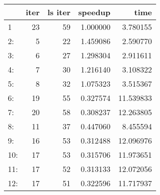 \begin{tabular}{lrrrr}
\toprule
{} &  iter &  ls iter &   speedup &       time \\
\midrule
1   &    23 &       59 &  1.000000 &   3.780155 \\
2:  &     5 &       22 &  1.459086 &   2.590770 \\
3:  &     6 &       27 &  1.298304 &   2.911611 \\
4:  &     7 &       30 &  1.216140 &   3.108322 \\
5:  &     8 &       32 &  1.075323 &   3.515367 \\
6:  &    19 &       55 &  0.327574 &  11.539833 \\
7:  &    20 &       58 &  0.308237 &  12.263805 \\
8:  &    11 &       37 &  0.447060 &   8.455594 \\
9:  &    16 &       53 &  0.312488 &  12.096976 \\
10: &    17 &       53 &  0.315706 &  11.973651 \\
11: &    17 &       52 &  0.313133 &  12.072056 \\
12: &    17 &       51 &  0.322596 &  11.717937 \\
\bottomrule
\end{tabular}
